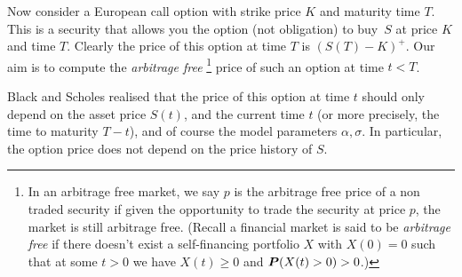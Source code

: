 Now consider a European call option with strike price $K$ and maturity time $T$.
This is a security that allows you the option (not obligation) to buy~$S$ at price $K$ and time $T$.
Clearly the price of this option at time $T$ is $(S(T) - K)^+$.
Our aim is to compute the \emph{arbitrage free}%
\footnote{
  In an arbitrage free market, we say $p$ is the arbitrage free price of a non traded security if given the opportunity to trade the security at price $p$, the market is still arbitrage free.
  (Recall a financial market is said to be \emph{arbitrage free} if there doesn't exist a self-financing portfolio $X$ with $X(0) = 0$ such that at some $t > 0$ we have $X(t) \geq 0$ and $\P(X(t) > 0) > 0$.)%
}
price of such an option at time $t < T$.

Black and Scholes realised that the price of this option at time $t$ should only depend on the asset price $S(t)$, and the current time $t$ (or more precisely, the time to maturity $T - t$), and of course the model parameters $\alpha, \sigma$.
In particular, the option price does not depend on the price history of $S$.

